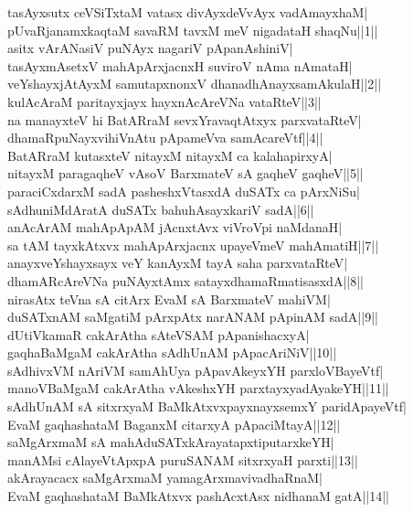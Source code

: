 \documentclass{article}
\begin{document}
tasAyxsutx ceVSiTxtaM vatasx divAyxdeVvAyx vadAmayxhaM|\\
pUvaRjanamxkaqtaM savaRM tavxM meV nigadataH shaqNu||1||\\
asitx vArANasiV puNAyx nagariV pApanAshiniV|\\
tasAyxmAsetxV mahApArxjacnxH suviroV nAma nAmataH|\\
veYshayxjAtAyxM samutapxnonxV dhanadhAnayxsamAkulaH||2||\\
kulAcAraM paritayxjayx hayxnAcAreVNa vataRteV||3||\\
na manayxteV hi BatARraM sevxYravaqtAtxyx parxvataRteV|\\
dhamaRpuNayxvihiVnAtu pApameVva samAcareVtf||4||\\
BatARraM kutasxteV nitayxM nitayxM ca kalahapirxyA|\\
nitayxM paragaqheV vAsoV BarxmateV sA gaqheV gaqheV||5||\\
paraciCxdarxM sadA pasheshxVtasxdA duSATx ca pArxNiSu|\\
sAdhuniMdAratA duSATx bahuhAsayxkariV sadA||6||\\
anAcArAM mahApApAM jAcnxtAvx viVroVpi naMdanaH|\\
sa tAM tayxkAtxvx mahApArxjacnx upayeVmeV mahAmatiH||7||\\
anayxveYshayxsayx veY kanAyxM tayA saha parxvataRteV|\\
dhamARcAreVNa puNAyxtAmx satayxdhamaRmatisasxdA||8||\\
nirasAtx teVna sA citArx EvaM sA BarxmateV mahiVM|\\
duSATxnAM saMgatiM pArxpAtx narANAM pApinAM sadA||9||\\
dUtiVkamaR cakArAtha sAteVSAM pApanishacxyA|\\
gaqhaBaMgaM cakArAtha sAdhUnAM pApacAriNiV||10||\\
sAdhivxVM nAriVM samAhUya pApavAkeyxYH parxloVBayeVtf|\\
manoVBaMgaM cakArAtha vAkeshxYH parxtayxyadAyakeYH||11||\\
sAdhUnAM sA sitxrxyaM BaMkAtxvxpayxnayxsemxY paridApayeVtf|\\
EvaM gaqhashataM BaganxM citarxyA pApaciMtayA||12||\\
saMgArxmaM sA mahAduSATxkArayatapxtiputarxkeYH|\\
manAMsi cAlayeVtApxpA puruSANAM sitxrxyaH parxti||13||\\
akArayacacx saMgArxmaM yamagArxmavivadhaRnaM|\\
EvaM gaqhashataM BaMkAtxvx pashAcxtAsx nidhanaM gatA||14||\\
\end{document}
